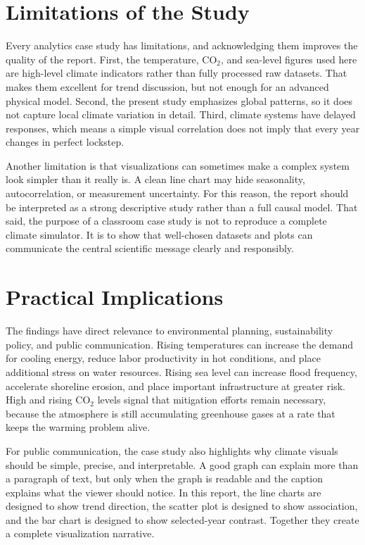 \documentclass[conference]{IEEEtran}
\begin{document}
\section{Limitations of the Study}
Every analytics case study has limitations, and acknowledging them improves the quality of the report. First, the temperature, CO$_2$, and sea-level figures used here are high-level climate indicators rather than fully processed raw datasets. That makes them excellent for trend discussion, but not enough for an advanced physical model. Second, the present study emphasizes global patterns, so it does not capture local climate variation in detail. Third, climate systems have delayed responses, which means a simple visual correlation does not imply that every year changes in perfect lockstep.

Another limitation is that visualizations can sometimes make a complex system look simpler than it really is. A clean line chart may hide seasonality, autocorrelation, or measurement uncertainty. For this reason, the report should be interpreted as a strong descriptive study rather than a full causal model. That said, the purpose of a classroom case study is not to reproduce a complete climate simulator. It is to show that well-chosen datasets and plots can communicate the central scientific message clearly and responsibly.

\section{Practical Implications}
The findings have direct relevance to environmental planning, sustainability policy, and public communication. Rising temperatures can increase the demand for cooling energy, reduce labor productivity in hot conditions, and place additional stress on water resources. Rising sea level can increase flood frequency, accelerate shoreline erosion, and place important infrastructure at greater risk. High and rising CO$_2$ levels signal that mitigation efforts remain necessary, because the atmosphere is still accumulating greenhouse gases at a rate that keeps the warming problem alive.

For public communication, the case study also highlights why climate visuals should be simple, precise, and interpretable. A good graph can explain more than a paragraph of text, but only when the graph is readable and the caption explains what the viewer should notice. In this report, the line charts are designed to show trend direction, the scatter plot is designed to show association, and the bar chart is designed to show selected-year contrast. Together they create a complete visualization narrative.
\end{document}
